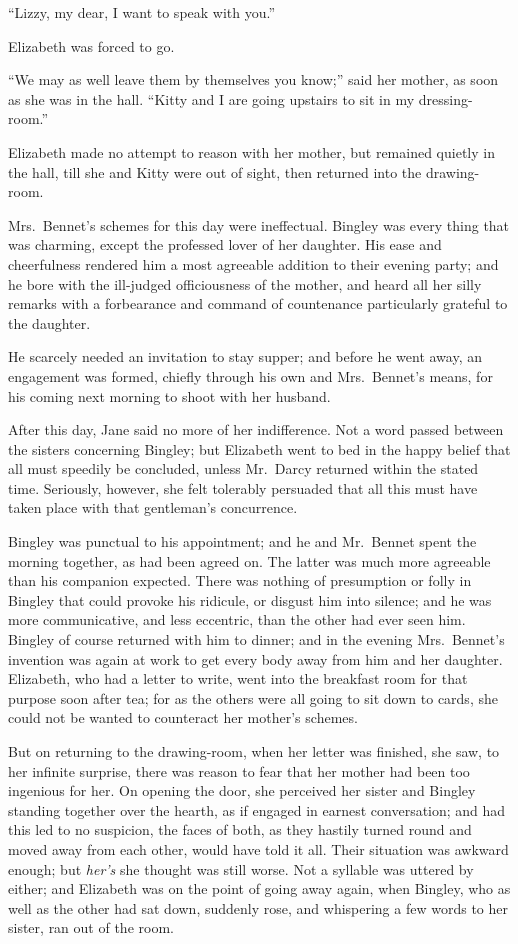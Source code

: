 \documentclass[12pt,english,oneside]{book}
\begin{document}
{}``Lizzy, my dear, I want to speak with you.''

Elizabeth was forced to go.

{}``We may as well leave them by themselves you know;'' said her
mother, as soon as she was in the hall. {}``Kitty and I are going
upstairs to sit in my dressing-room.''

Elizabeth made no attempt to reason with her mother, but remained
quietly in the hall, till she and Kitty were out of sight, then returned
into the drawing-room.

Mrs.\ Bennet's schemes for this day were ineffectual. Bingley was
every thing that was charming, except the professed lover of her daughter.
His ease and cheerfulness rendered him a most agreeable addition to
their evening party; and he bore with the ill-judged officiousness
of the mother, and heard all her silly remarks with a forbearance
and command of countenance particularly grateful to the daughter.

He scarcely needed an invitation to stay supper; and before he went
away, an engagement was formed, chiefly through his own and Mrs.\ Bennet's
means, for his coming next morning to shoot with her husband.

After this day, Jane said no more of her indifference. Not a word
passed between the sisters concerning Bingley; but Elizabeth went
to bed in the happy belief that all must speedily be concluded, unless
Mr.\ Darcy returned within the stated time. Seriously, however, she
felt tolerably persuaded that all this must have taken place with
that gentleman's concurrence.

Bingley was punctual to his appointment; and he and Mr.\ Bennet spent
the morning together, as had been agreed on. The latter was much more
agreeable than his companion expected. There was nothing of presumption
or folly in Bingley that could provoke his ridicule, or disgust him
into silence; and he was more communicative, and less eccentric, than
the other had ever seen him. Bingley of course returned with him to
dinner; and in the evening Mrs.\ Bennet's invention was again at
work to get every body away from him and her daughter. Elizabeth,
who had a letter to write, went into the breakfast room for that purpose
soon after tea; for as the others were all going to sit down to cards,
she could not be wanted to counteract her mother's schemes.

But on returning to the drawing-room, when her letter was finished,
she saw, to her infinite surprise, there was reason to fear that her
mother had been too ingenious for her. On opening the door, she perceived
her sister and Bingley standing together over the hearth, as if engaged
in earnest conversation; and had this led to no suspicion, the faces
of both, as they hastily turned round and moved away from each other,
would have told it all. Their situation was awkward enough; but \textit{her's}
she thought was still worse. Not a syllable was uttered by either;
and Elizabeth was on the point of going away again, when Bingley,
who as well as the other had sat down, suddenly rose, and whispering
a few words to her sister, ran out of the room.
\end{document}
